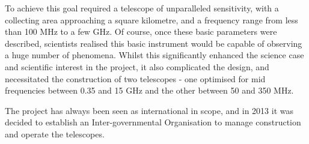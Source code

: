 \documentclass[a4paper,
               biblatex,     %
               keeplastbox,   %
               ]{jacow}
\begin{document}
To achieve this goal required a telescope of unparalleled sensitivity, with a collecting area approaching a square kilometre, and a frequency range from less than 100 MHz to a few GHz. Of course, once these basic parameters were described, scientists realised this basic instrument would be capable of observing a huge number of phenomena. Whilst this significantly enhanced the science case and scientific interest in the project, it also complicated the design, and necessitated the construction of two telescopes - one optimised for mid frequencies between 0.35 and 15 GHz and the other between 50 and 350 MHz.

The project has always been seen as international in scope, and in 2013 it was decided to establish an Inter-governmental Organisation to manage construction and operate the telescopes.
\end{document}
